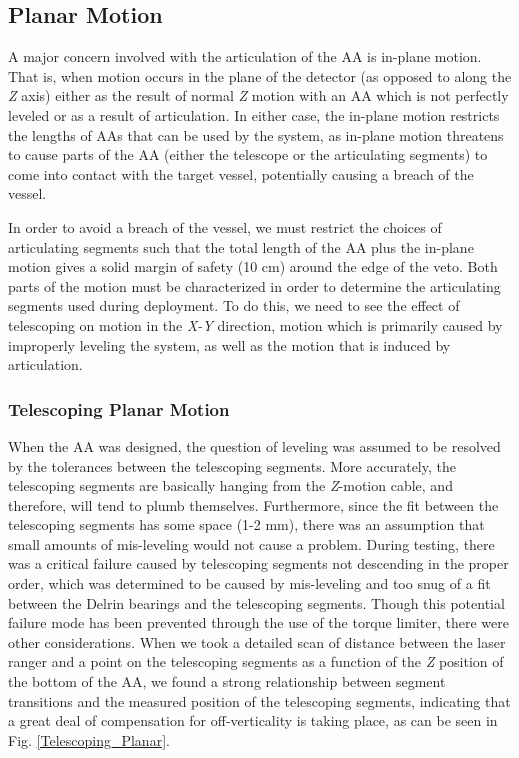 \subsection{Planar Motion}
  A major concern involved with the articulation of the AA is in-plane motion. That is, when motion occurs in the plane of the detector (as opposed to along the \emph{Z} axis) either as the result of normal \emph{Z} motion with an AA which is not perfectly leveled or as a result of articulation. In either case, the in-plane motion restricts the lengths of AAs that can be used by the system, as in-plane motion threatens to cause parts of the AA (either the telescope or the articulating segments) to come into contact with the target vessel, potentially causing a breach of the vessel. 
  
  In order to avoid a breach of the vessel, we must restrict the choices of articulating segments such that the total length of the AA plus the in-plane motion gives a solid margin of safety (10 cm) around the edge of the veto. Both parts of the motion must be characterized in order to determine the articulating segments used during deployment. To do this, we need to see the effect of telescoping on motion in the \emph{X-Y} direction, motion which is primarily caused by improperly leveling the system, as well as the motion that is induced by articulation.
  
  
  \subsubsection{Telescoping Planar Motion}
  When the AA was designed, the question of leveling was assumed to be resolved by the tolerances between the telescoping segments. More accurately, the telescoping segments are basically hanging from the \emph{Z}-motion cable, and therefore, will tend to plumb themselves. Furthermore, since the fit between the telescoping segments has some space (1-2 mm), there was an assumption that small amounts of mis-leveling would not cause a problem. During testing, there was a critical failure caused by telescoping segments not descending in the proper order, which was determined to be caused by mis-leveling and too snug of a fit between the Delrin bearings and the telescoping segments. Though this potential failure mode has been prevented through the use of the torque limiter, there were other considerations. When we took a detailed scan of distance between the laser ranger and a point on the telescoping segments as a function of the \emph{Z} position of the bottom of the AA, we found a strong relationship between segment transitions and the measured position of the telescoping segments, indicating that a great deal of compensation for off-verticality is taking place, as can be seen in Fig. \ref{Telescoping_Planar}.
  
